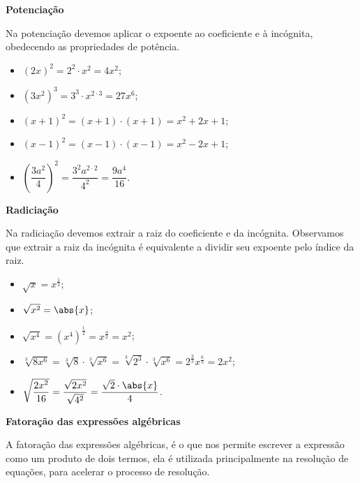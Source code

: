  \vskip0.3cm

  \textbf{Potenciação}

  Na potenciação devemos aplicar o expoente ao coeficiente e à incógnita, obedecendo as propriedades de potência.

    \begin{itemize}
     \item $(2x)^2= 2^2 \cdot x^2= 4x^2$;
     \item $(3x^2)^3= 3^3 \cdot x^{2\cdot 3}= 27x^6$;
     \item $(x+1)^2= (x+1) \cdot (x+1)= x^2 + 2x +1$;
     \item $(x-1)^2= (x-1) \cdot (x-1)= x^2 - 2x +1$;
     \item $\left(\dfrac{3a^2}{4}\right)^2= \dfrac{3^2 a^{2 \cdot 2}}{4^2}= \dfrac{9a^4}{16}$.
    \end{itemize}

  \vskip0.3cm

  \textbf{Radiciação}

  Na radiciação devemos extrair a raiz do coeficiente e da incógnita. Observamos que extrair a raiz da incógnita é equivalente a dividir seu expoente pelo índice da raiz.
    \begin{itemize}
     \item $\sqrt{x}= x^{\frac{1}{2}}$;
     \item $\sqrt{x^2}= \abs{x}$;
     \item $\sqrt{x^4}= (x^4)^{\frac{1}{2}}= x^{\frac{4}{2}}= x^2$;
     \item $\sqrt[3]{8x^6}= \sqrt[3]{8} \cdot \sqrt[3]{x^6}=\sqrt[3]{2^3} \cdot \sqrt[3]{x^6} = 2^{\frac{3}{3}} x^{\frac{6}{3}}= 2x^2$;
     \item $\sqrt{\dfrac{2x^2}{16}}= \dfrac{\sqrt{2x^2}}{\sqrt{4^2}}= \dfrac{\sqrt{2} \cdot \abs{x}}{4}$.
     
    \end{itemize}

 \vskip0.3cm

  \textbf{Fatoração das expressões algébricas}

 \vskip0.3cm

 A fatoração das expressões algébricas, é o que nos permite escrever a expressão como um produto de dois termos, ela é utilizada principalmente na resolução de equações, para acelerar o processo de resolução.

